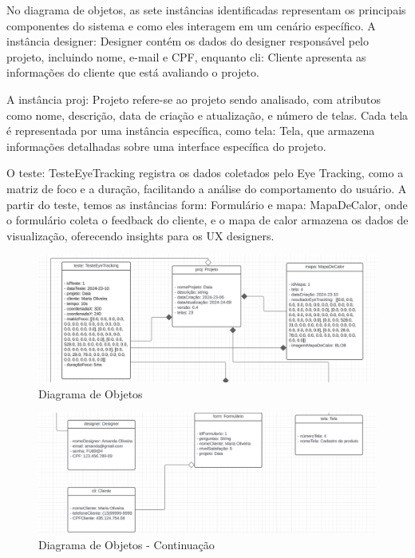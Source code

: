 No diagrama de objetos, as sete instâncias identificadas representam os principais componentes do sistema e como eles interagem em um cenário específico. A instância designer: Designer contém os dados do designer responsável pelo projeto, incluindo nome, e-mail e CPF, enquanto cli: Cliente apresenta as informações do cliente que está avaliando o projeto.

A instância proj: Projeto refere-se ao projeto sendo analisado, com atributos como nome, descrição, data de criação e atualização, e número de telas. Cada tela é representada por uma instância específica, como tela: Tela, que armazena informações detalhadas sobre uma interface específica do projeto.

O teste: TesteEyeTracking registra os dados coletados pelo Eye Tracking, como a matriz de foco e a duração, facilitando a análise do comportamento do usuário. A partir do teste, temos as instâncias form: Formulário e mapa: MapaDeCalor, onde o formulário coleta o feedback do cliente, e o mapa de calor armazena os dados de visualização, oferecendo insights para os UX designers.\newline

\begin{figure}[H]
    \centering
    \caption{Diagrama de Objetos}%
    \label{fig:pg-objetos}
    \includegraphics[width=0.72\linewidth]{Illustrations/objetos1.png}
\end{figure}

\vspace{12pt}

\begin{figure}[H]
    \centering
    \caption{Diagrama de Objetos - Continuação}%
    \label{fig:pg-objetos2}
    \includegraphics[width=0.72\linewidth]{Illustrations/objetos2.png}
\end{figure}

